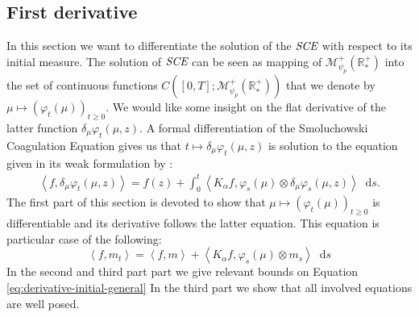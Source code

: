 \documentclass[11pt,a4paper]{article}
\newcommand{\RRP}{\mathbb{R}^+_*}
\newcommand{\MC}{\mathcal{M}}
\newcommand{\SCE}{\emph{SCE}}
\newcommand{\Proc}[1]{\left(#1\right)_{t\geq 0}}
\newcommand{\brac}[1]{\left\langle#1\right\rangle}
\newcommand{\dd}{\mathop{}\!\mathrm{d}}
\begin{document}
\subsection{First derivative}
In this section we want to differentiate the solution of the $\SCE$ with respect to its initial measure. The solution of $\SCE$ can be seen as mapping of $\MC^+_{\psi_p}\left(\RRP \right)$ into the set of continuous functions $C\left([0,T];\MC^+_{\psi_p}\left(\RRP \right)\right)$ that we denote by $\mu \mapsto \Proc{\varphi_t(\mu)}$. We would like some insight on the flat derivative of the latter function $\delta_\mu \varphi_t(\mu,z)$. A formal differentiation of the Smoluchowski Coagulation Equation gives us that $t \mapsto \delta_\mu \varphi_t(\mu,z)$ is solution to the equation given in its weak formulation by :
\begin{align*}
    \brac{f,\delta_\mu \varphi_t(\mu,z)} = f(z) + \int_0^t \brac{K_\alpha f,\varphi_s(\mu)\otimes \delta_\mu \varphi_s(\mu,z)}\dd s.
\end{align*}
The first part of this section is devoted to show that $\mu \mapsto \Proc{\varphi_t(\mu)}$ is differentiable and its derivative follows the latter equation. This equation is particular case of the following: 
\begin{equation}\label{eq:derivative-initial-general}
    \brac{f,m_t} = \brac{f,m} + \brac{K_\alpha f,\varphi_s(\mu)\otimes m_s}\dd s
\end{equation}
In the second and third part part we give relevant bounds on Equation \eqref{eq:derivative-initial-general} In the third part we show that all involved equations are well posed.
\end{document}
